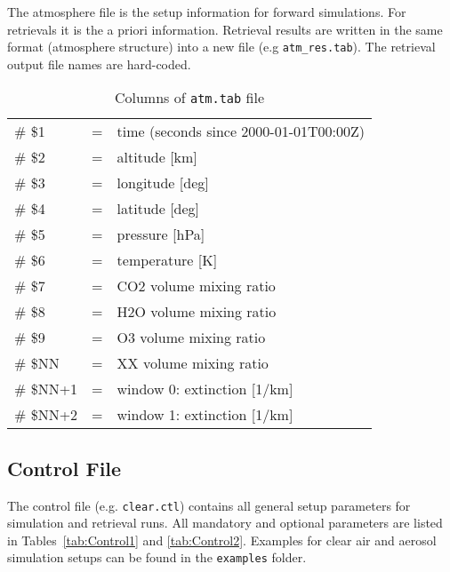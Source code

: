The atmosphere file is the setup information for forward simulations. For retrievals it is the a priori information. Retrieval results are written in the same format (atmosphere structure) into a new file (e.g \texttt{atm\_res.tab}). The retrieval output file names are hard-coded.

\begin{table*}[!h]
\caption{Columns of \texttt{atm.tab} file}
\begin{tabular}{lcl}
\# \$1 & = & time (seconds since 2000-01-01T00:00Z) \\
\# \$2 & = & altitude [km] \\
\# \$3 & = & longitude [deg] \\
\# \$4 & = & latitude [deg] \\
\# \$5 & = & pressure [hPa] \\
\# \$6 & = & temperature [K] \\
\# \$7 & = & CO2 volume mixing ratio \\
\# \$8 & = & H2O volume mixing ratio \\
\# \$9 & = & O3 volume mixing ratio \\
\# \$NN   & = & XX volume mixing ratio \\
\# \$NN+1 & = & window 0: extinction [1/km] \\
\# \$NN+2 & = & window 1: extinction [1/km] \\
\end{tabular}
\end{table*} 


\subsection{Control File}
\label{sec:ControlFile}
The control file (e.g. \texttt{clear.ctl}) contains all general setup parameters for simulation and retrieval runs. All mandatory and optional parameters are listed in Tables~\ref{tab:Control1} and \ref{tab:Control2}. Examples for clear air and aerosol simulation setups can be found in the \texttt{examples} folder.

